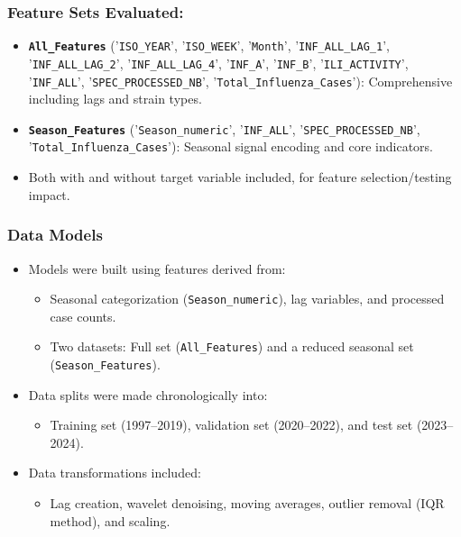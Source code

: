 \subsubsection*{Feature Sets Evaluated:}

\begin{itemize}
  \item \textbf{\texttt{All\_Features}} ('\texttt{ISO\_YEAR}', '\texttt{ISO\_WEEK}', '\texttt{Month}', '\texttt{INF\_ALL\_LAG\_1}', '\texttt{INF\_ALL\_LAG\_2}', '\texttt{INF\_ALL\_LAG\_4}', '\texttt{INF\_A}', '\texttt{INF\_B}', '\texttt{ILI\_ACTIVITY}', '\texttt{INF\_ALL}', '\texttt{SPEC\_PROCESSED\_NB}', '\texttt{Total\_Influenza\_Cases}'): Comprehensive including lags and strain types.
  \item \textbf{\texttt{Season\_Features}} ('\texttt{Season\_numeric}', '\texttt{INF\_ALL}', '\texttt{SPEC\_PROCESSED\_NB}', '\texttt{Total\_Influenza\_Cases}'): Seasonal signal encoding and core indicators.
  \item Both with and without target variable included, for feature selection/testing impact.
\end{itemize}

\subsubsection*{Data Models}

\begin{itemize}
  \item Models were built using features derived from:
  \begin{itemize}
    \item Seasonal categorization (\texttt{Season\_numeric}), lag variables, and processed case counts.
    \item Two datasets: Full set (\texttt{All\_Features}) and a reduced seasonal set (\texttt{Season\_Features}).
  \end{itemize}
  \item Data splits were made chronologically into:
  \begin{itemize}
    \item Training set (1997--2019), validation set (2020--2022), and test set (2023--2024).
  \end{itemize}
  \item Data transformations included:
  \begin{itemize}
    \item Lag creation, wavelet denoising, moving averages, outlier removal (IQR method), and scaling.
  \end{itemize}
\end{itemize}

